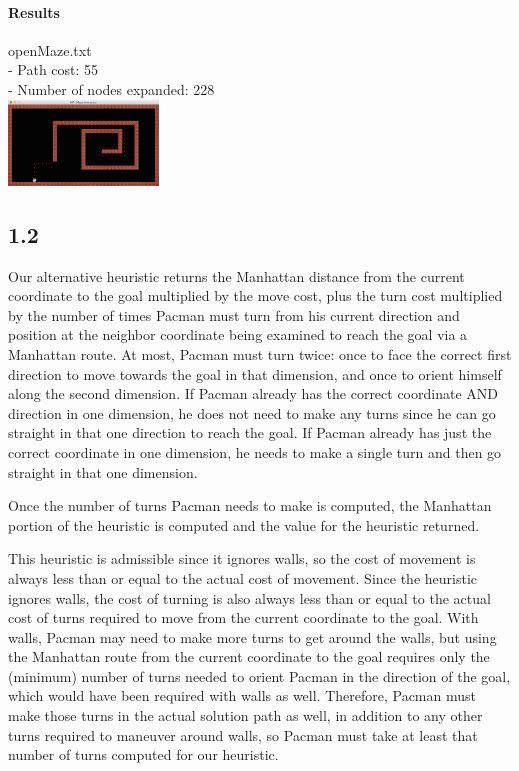 \begin{multicols*}{2}
\paragraph{Results}
openMaze.txt\\
- Path cost: 55\\
- Number of nodes expanded: 228\\
\includegraphics[width=0.3\textwidth]{graphics/openMaze_astar.png}

\subsection*{1.2}
Our alternative heuristic returns the Manhattan distance from the current coordinate to the goal multiplied by the move cost, plus the turn cost multiplied by the number of times Pacman must turn from his current direction and position at the neighbor coordinate being examined to reach the goal via a Manhattan route. At most, Pacman must turn twice: once to face the correct first direction to move towards the goal in that dimension, and once to orient himself along the second dimension. If Pacman already has the correct coordinate AND direction in one dimension, he does not need to make any turns since he can go straight in that one direction to reach the goal. If Pacman already has just the correct coordinate in one dimension, he needs to make a single turn and then go straight in that one dimension.

Once the number of turns Pacman needs to make is computed, the Manhattan portion of the heuristic is computed and the value for the heuristic returned.

This heuristic is admissible since it ignores walls, so the cost of movement is always less than or equal to the actual cost of movement. Since the heuristic ignores walls, the cost of turning is also always less than or equal to the actual cost of turns required to move from the current coordinate to the goal. With walls, Pacman may need to make more turns to get around the walls, but using the Manhattan route from the current coordinate to the goal requires only the (minimum) number of turns needed to orient Pacman in the direction of the goal, which would have been required with walls as well. Therefore, Pacman must make those turns in the actual solution path as well, in addition to any other turns required to maneuver around walls, so Pacman must take at least that number of turns computed for our heuristic.


\end{multicols*}
